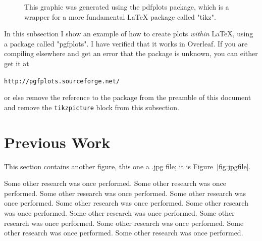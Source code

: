 \documentclass[11pt]{ucscthesisbs}
\begin{document}
\begin{figure}\label{agraphic}
\centering
{}
\caption{This graphic was generated using the pdfplots package, which is a wrapper for a more fundamental LaTeX package called "tikz".  }
\end{figure}

In this subsection I show an example of how to create plots {\it within} LaTeX, using a package called "pgfplots".  I have verified that it works in Overleaf.  If you are compiling elsewhere and get an error that the package is unknown, you can either get it at 
\begin{center}
{\tt http://pgfplots.sourceforge.net/}
\end{center}
or else remove the reference to the package from the preamble of this document and remove the {\tt tikzpicture} block from this subsection.



\chapter{Previous Work}

This section contains another figure, this one a .jpg file; it is Figure~\ref{fig:jpgfile}.

Some other research was once performed.
Some other research was once performed.
Some other research was once performed.
Some other research was once performed.
Some other research was once performed.
Some other research was once performed.
Some other research was once performed.
Some other research was once performed.
Some other research was once performed.
Some other research was once performed.
Some other research was once performed.
\end{document}
